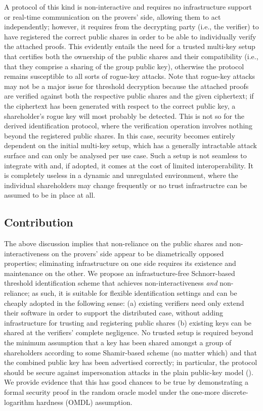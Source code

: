 \documentclass{iacrtrans}
\begin{document}
A protocol of this kind is non-interactive and requires
no infrastructure support or real-time communication on the provers' side,
allowing them to act independently; however,
it requires from the decrypting party (i.e., the verifier)
to have registered the correct public shares
in order to be able to individually verify the attached proofs.
This evidently entails the need for a trusted multi-key setup
that certifies both the ownership of the public shares
and their compatibility (i.e., that they
comprise a sharing of the group public key),
otherwise the protocol remains susceptible
to all sorts of rogue-key attacks.
Note that rogue-key attacks may not be a major issue
for threshold decryption because the attached
proofs are verified against both the respective public shares
and the given ciphertext; if the ciphertext has been generated
with respect to the correct public key,
a shareholder's rogue key will
most probably be detected. This is not so for the derived
identification protocol,
where the verification operation involves nothing
beyond the registered public shares.
In this case, security becomes
entirely dependent on the initial multi-key setup,
which has a generally intractable attack surface
and can only be analysed per use case.
Such a setup is not seamless to integrate with and,
if adopted, it comes at the cost of limited interoperability.
It is completely useless
in a dynamic and unregulated environment,
where the individual shareholders may change frequently or
no trust infrastructre can be assumed to be
in place at all.

\subsection{Contribution}\label{section_contribution}
The above discussion implies
that non-reliance on the public shares
and non-interactiveness on the provers' side appear to be
diametrically opposed properties;
eliminating infrastructure on one side
requires its existence and maintenance on the other.
We propose an infrastucture-free
Schnorr-based threshold identification scheme
that achieves non-interactiveness \textit{and} non-reliance;
as such, it is suitable for flexible identification
settings and can be cheaply adopted
in the following sense: (a) existing verifiers
need only extend their software
in order to support the distributed case,
without adding infrastructure
for trusting and registering
public shares (b) existing keys
can be shared at the verifiers' complete negligence.
No trusted setup is required beyond
the minimum assumption that a key has been
shared amongst a group of shareholders according to some
Shamir-based scheme (no matter which)
and that the combined public key has been advertised
correctly; in particular,
the protocol should be secure against
impersonation attacks in the plain public-key model
(\cite{paper_bellare_musig}).
We provide evidence that this has good chances to be true
by demonstrating a formal security proof in the random oracle model
under the one-more discrete-logarithm hardness (OMDL) assumption.
\end{document}
